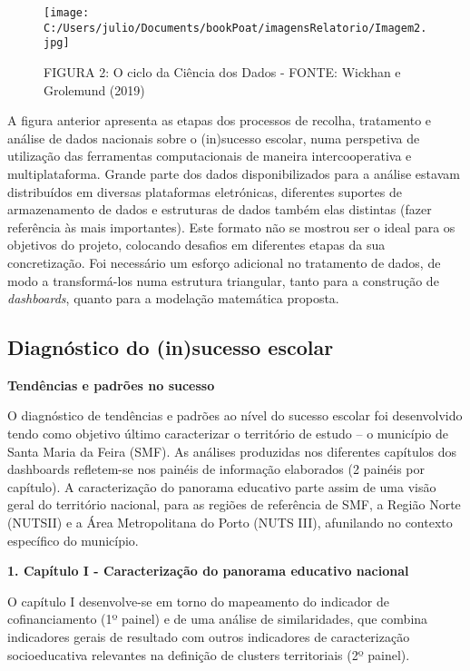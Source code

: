 \documentclass[
]{book}
\begin{document}
\begin{figure}
\centering
\texttt{[image: C:/Users/julio/Documents/bookPoat/imagensRelatorio/Imagem2.jpg]}
\caption{FIGURA 2: O ciclo da Ciência dos Dados - FONTE: Wickhan e Grolemund (2019)}
\end{figure}

A figura anterior apresenta as etapas dos processos de recolha, tratamento e análise de dados nacionais sobre o (in)sucesso escolar, numa perspetiva de utilização das ferramentas computacionais de maneira intercooperativa e multiplataforma. Grande parte dos dados disponibilizados para a análise estavam distribuídos em diversas plataformas eletrónicas, diferentes suportes de armazenamento de dados e estruturas de dados também elas distintas (fazer referência às mais importantes). Este formato não se mostrou ser o ideal para os objetivos do projeto, colocando desafios em diferentes etapas da sua concretização. Foi necessário um esforço adicional no tratamento de dados, de modo a transformá-los numa estrutura triangular, tanto para a construção de \emph{dashboards}, quanto para a modelação matemática proposta.

\hypertarget{diagnuxf3stico-do-insucesso-escolar}{%
\subsection{Diagnóstico do (in)sucesso escolar}\label{diagnuxf3stico-do-insucesso-escolar}}

\textbf{Tendências e padrões no sucesso}

O diagnóstico de tendências e padrões ao nível do sucesso escolar foi desenvolvido tendo como objetivo último caracterizar o território de estudo -- o município de Santa Maria da Feira (SMF). As análises produzidas nos diferentes capítulos dos dashboards refletem-se nos painéis de informação elaborados (2 painéis por capítulo). A caracterização do panorama educativo parte assim de uma visão geral do território nacional, para as regiões de referência de SMF, a Região Norte (NUTSII) e a Área Metropolitana do Porto (NUTS III), afunilando no contexto específico do município.

\textbf{1. Capítulo I - Caracterização do panorama educativo nacional}

O capítulo I desenvolve-se em torno do mapeamento do indicador de cofinanciamento (1º painel) e de uma análise de similaridades, que combina indicadores gerais de resultado com outros indicadores de caracterização socioeducativa relevantes na definição de clusters territoriais (2º painel).
\end{document}
